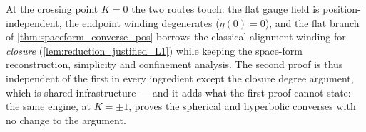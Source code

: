 At the crossing point $K=0$ the two routes touch: the flat gauge
field is position-independent, the endpoint winding degenerates
($\eta(0)=0$), and the flat branch of \cref{thm:spaceform_converse_pos}
borrows the classical alignment winding for \emph{closure}
(\cref{lem:reduction_justified_L1}) while keeping the space-form
reconstruction, simplicity and confinement analysis. The second proof is thus
independent of the first in every ingredient except the closure degree
argument, which is shared infrastructure — and it adds what the first proof
cannot state: the same engine, at $K=\pm1$, proves the spherical
and hyperbolic converses with no change to the argument.
